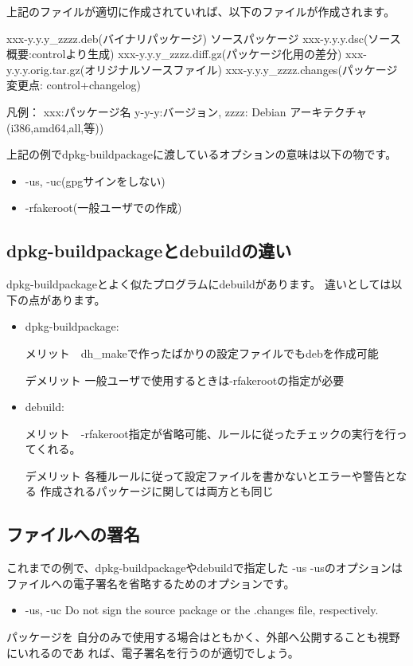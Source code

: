 \documentclass[mingoth,a4paper]{jsarticle}
\begin{document}
上記のファイルが適切に作成されていれば、以下のファイルが作成されます。
\begin{commandline}
 xxx-y.y.y_zzzz.deb(バイナリパッケージ)
 ソースパッケージ
 xxx-y.y.y.dsc(ソース概要:controlより生成)
 xxx-y.y.y_zzzz.diff.gz(パッケージ化用の差分)
 xxx-y.y.y.orig.tar.gz(オリジナルソースファイル)
 xxx-y.y.y_zzzz.changes(パッケージ変更点: control+changelog)

凡例： 
	xxx:パッケージ名
	y-y-y:バージョン,
	zzzz: Debian アーキテクチャ(i386,amd64,all,等))
\end{commandline}

上記の例でdpkg-buildpackageに渡しているオプションの意味は以下の物です。
\begin{itemize}
 \item  -us, -uc(gpgサインをしない)
 \item  -rfakeroot(一般ユーザでの作成)
\end{itemize}


\subsection{dpkg-buildpackageとdebuildの違い}

dpkg-buildpackageとよく似たプログラムにdebuildがあります。
違いとしては以下の点があります。

\begin{itemize}
 \item  dpkg-buildpackage:

 メリット　dh\_makeで作ったばかりの設定ファイルでもdebを作成可能

 デメリット 一般ユーザで使用するときは-rfakerootの指定が必要
 \item  debuild:

 メリット　-rfakeroot指定が省略可能、ルールに従ったチェックの実行を行っ
	てくれる。

 デメリット 各種ルールに従って設定ファイルを書かないとエラーや警告となる
 作成されるパッケージに関しては両方とも同じ
\end{itemize}


\subsection{ファイルへの署名}

これまでの例で、dpkg-buildpackageやdebuildで指定した -us -usのオプションは
ファイルへの電子署名を省略するためのオプションです。
\begin{itemize}
 \item  -us, -uc
 Do not sign the source package or the .changes file, respectively.
\end{itemize}
パッケージを
自分のみで使用する場合はともかく、外部へ公開することも視野にいれるのであ
れば、電子署名を行うのが適切でしょう。
\end{document}
